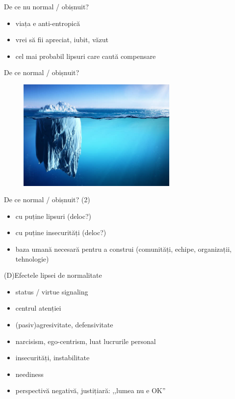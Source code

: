 \documentclass{simple}
\begin{document}
\begin{frame}{De ce nu normal / obișnuit?}
  \begin{itemize}
    \item viața e anti-entropică
    \item vrei să fii apreciat, iubit, văzut
    \item cel mai probabil lipsuri care caută compensare
  \end{itemize}
\end{frame}

\begin{frame}{De ce normal / obișnuit?}
  \begin{figure}
    \centering
    \includegraphics[width=0.7\textwidth]{img/iceberg.jpg}
  \end{figure}
\end{frame}

\begin{frame}{De ce normal / obișnuit? (2)}
  \begin{itemize}
    \pause \item cu puține lipsuri (deloc?)
    \pause \item cu puține insecurități (deloc?)
    \pause \item baza umană necesară pentru a construi (comunități, echipe, organizații, tehnologie)
  \end{itemize}
\end{frame}

\begin{frame}{(D)Efectele lipsei de normalitate}
  \begin{itemize}
    \pause
    \item status / virtue signaling
    \item centrul atenției
    \item (pasiv)agresivitate, defensivitate
    \item narcisism, ego-centrism, luat lucrurile personal
    \item insecurități, instabilitate
    \item neediness
    \item perspectivă negativă, justițiară: ,,lumea nu e OK''
  \end{itemize}
\end{frame}
\end{document}
